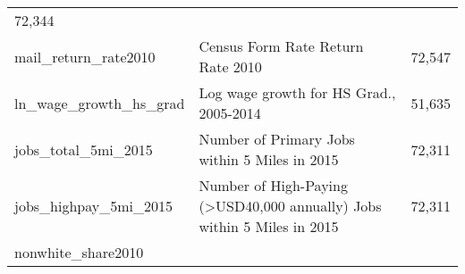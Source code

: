 \documentclass[]{book}
\begin{document}
\begin{longtable}[]{@{}lll@{}}
\begin{minipage}[t]{0.04\columnwidth}
72,344\strut
\end{minipage}\tabularnewline
\begin{minipage}[t]{0.04\columnwidth}\raggedright\strut
mail\_return\_rate2010\strut
\end{minipage} & \begin{minipage}[t]{0.04\columnwidth}\raggedright\strut
Census Form Rate Return Rate 2010\strut
\end{minipage} & \begin{minipage}[t]{0.04\columnwidth}\raggedright\strut
72,547\strut
\end{minipage}\tabularnewline
\begin{minipage}[t]{0.04\columnwidth}\raggedright\strut
ln\_wage\_growth\_hs\_grad\strut
\end{minipage} & \begin{minipage}[t]{0.04\columnwidth}\raggedright\strut
Log wage growth for HS Grad., 2005-2014\strut
\end{minipage} & \begin{minipage}[t]{0.04\columnwidth}\raggedright\strut
51,635\strut
\end{minipage}\tabularnewline
\begin{minipage}[t]{0.04\columnwidth}\raggedright\strut
jobs\_total\_5mi\_2015\strut
\end{minipage} & \begin{minipage}[t]{0.04\columnwidth}\raggedright\strut
Number of Primary Jobs within 5 Miles in 2015\strut
\end{minipage} & \begin{minipage}[t]{0.04\columnwidth}\raggedright\strut
72,311\strut
\end{minipage}\tabularnewline
\begin{minipage}[t]{0.04\columnwidth}\raggedright\strut
jobs\_highpay\_5mi\_2015\strut
\end{minipage} & \begin{minipage}[t]{0.04\columnwidth}\raggedright\strut
Number of High-Paying (\textgreater{}USD40,000 annually) Jobs within 5
Miles in 2015\strut
\end{minipage} & \begin{minipage}[t]{0.04\columnwidth}\raggedright\strut
72,311\strut
\end{minipage}\tabularnewline
\begin{minipage}[t]{0.04\columnwidth}\raggedright\strut
nonwhite\_share2010\strut
\end{minipage} & \begin{minipage}[t]{0.04\columnwidth}\raggedright\strut

\end{minipage}
\end{longtable}
\end{document}
